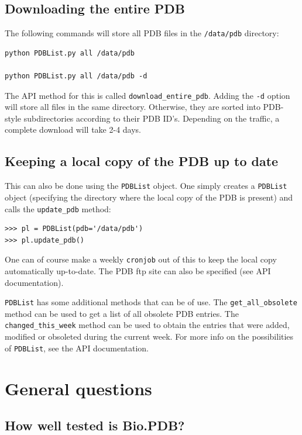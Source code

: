 \documentclass{report}
\begin{document}
\subsection{Downloading the entire PDB}

The following commands will store all PDB files in the \texttt{/data/pdb}
directory: 

\begin{verbatim}
python PDBList.py all /data/pdb

python PDBList.py all /data/pdb -d
\end{verbatim}
\noindent The API method for this is called \texttt{download\_entire\_pdb}.
Adding the \texttt{-d} option will store all files in the same directory.
Otherwise, they are sorted into PDB-style subdirectories according
to their PDB ID's. Depending on the traffic, a complete download will
take 2-4 days. 

\subsection{Keeping a local copy of the PDB up to date}

This can also be done using the \texttt{PDBList} object. One simply
creates a \texttt{PDBList} object (specifying the directory where
the local copy of the PDB is present) and calls the \texttt{update\_pdb}
method:

\begin{verbatim}
>>> pl = PDBList(pdb='/data/pdb')
>>> pl.update_pdb()
\end{verbatim}
One can of course make a weekly \texttt{cronjob} out of this to keep
the local copy automatically up-to-date. The PDB ftp site can also
be specified (see API documentation).

\texttt{PDBList} has some additional methods that can be of use. The
\texttt{get\_all\_obsolete} method can be used to get a list of all
obsolete PDB entries. The \texttt{changed\_this\_week} method can
be used to obtain the entries that were added, modified or obsoleted
during the current week. For more info on the possibilities of \texttt{PDBList},
see the API documentation.

\section{General questions}

\subsection{How well tested is Bio.PDB?}
\end{document}
